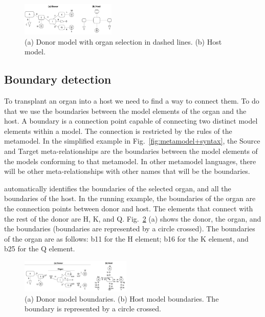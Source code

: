 \begin{figure}[h]
    \centering
    \includegraphics[width=0.4\textwidth]{Figures/donor+host.png}
    \caption{(a) Donor model with organ selection in dashed lines. (b) Host model.}
    \label{fig:donor_host}
\end{figure}


\subsection{Boundary detection}

To transplant an organ into a host we need to find a way to connect them. To do that we use the boundaries between the model elements of the organ and the host. A boundary is a connection point capable of connecting two distinct model elements within a model. The connection is restricted by the rules of the metamodel. In the simplified example in Fig.~\ref{fig:metamodel+syntax}, the Source and Target meta-relationships are the boundaries between the model elements of the models conforming to that metamodel. In other metamodel languages, there will be other meta-relationships with other names that will be the boundaries.

\ApproachName{} automatically identifies the boundaries of the selected organ, and all the boundaries of the host. In the running example, the boundaries of the organ are the connection points between donor and host. The elements that connect with the rest of the donor are H, K, and Q. Fig.~\ref{fig:org_bound} (a) shows the donor, the organ, and the boundaries (boundaries are represented by a circle crossed). The boundaries of the organ are as follows: b11 for the H element; b16 for the K element, and b25 for the Q element.

\begin{figure}[h]
    \centering
    \includegraphics[width=0.47\textwidth]{Figures/donor+host+boundaries.png}
    \caption{(a) Donor model boundaries. (b) Host model boundaries. The boundary is represented by a circle crossed.}
    \label{fig:org_bound}
\end{figure}

